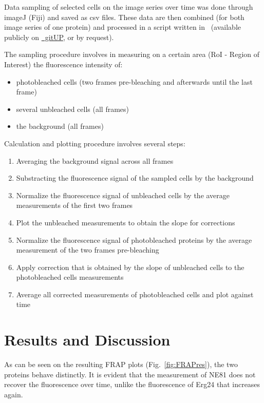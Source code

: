 Data sampling of selected cells on the image series over time was done through imageJ (Fiji) and saved as csv files. 
These data are then combined (for both image series of one protein) and processed in a script written in \faRProject~(available publicly on \href{https://gitup.uni-potsdam.de/showard/lightmicroscopy}{\faGitlab~gitUP}, or by request).

The sampling procedure involves in measuring on a certain area (RoI - Region of Interest) the fluorescence intensity of: 
\begin{itemize}
\item photobleached cells (two frames pre-bleaching and afterwards until the last frame)
\item several unbleached cells (all frames)
\item the background (all frames)
\end{itemize}

Calculation and plotting procedure involves several steps:
\begin{enumerate}
\item Averaging the background signal across all frames
\item Substracting the fluorescence signal of the sampled cells by the background
\item Normalize the fluorescence signal of unbleached cells by the average measurements of the first two frames
\item Plot the unbleached measurements to obtain the slope for corrections
\item Normalize the fluorescence signal of photobleached proteins by the average measurement of the two frames pre-bleaching
\item Apply correction that is obtained by the slope of unbleached cells to the photobleached cells measurements
\item Average all corrected measurements of photobleached cells and plot against time
\end{enumerate}
\section{Results and Discussion}

As can be seen on the resulting FRAP plots (Fig.~\ref{fig:FRAPres}), the two proteins behave distinctly. 
It is evident that the measurement of NE81 does not recover the fluorescence over time, unlike the fluorescence of Erg24 that increases again. 

